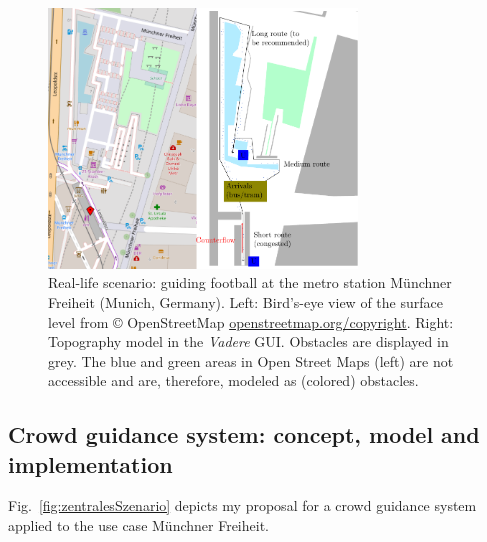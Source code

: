 \begin{figure}[H]
\centering
\includegraphics[width=0.73\textwidth]{../figures/investigation/RealisticScenario/applicationusecase.pdf} 
\caption[Real-life application scenario: rerouting pedestrians at the metro station Münchner Freiheit (Munich) ]{Real-life scenario: guiding football at the metro station Münchner Freiheit (Munich, Germany). Left: Bird's-eye view of the surface level from © OpenStreetMap \url{openstreetmap.org/copyright}. Right: Topography model in the \textit{Vadere} GUI. Obstacles are displayed in grey. The blue and green areas in Open Street Maps (left) are not accessible and are, therefore, modeled as (colored) obstacles.}
\label{fig:reallifeusecase}
\end{figure}





\subsection{Crowd guidance system: concept, model and implementation}

Fig.~\ref{fig:zentralesSzenario} depicts my proposal for a crowd guidance system applied to the use case Münchner Freiheit.  

